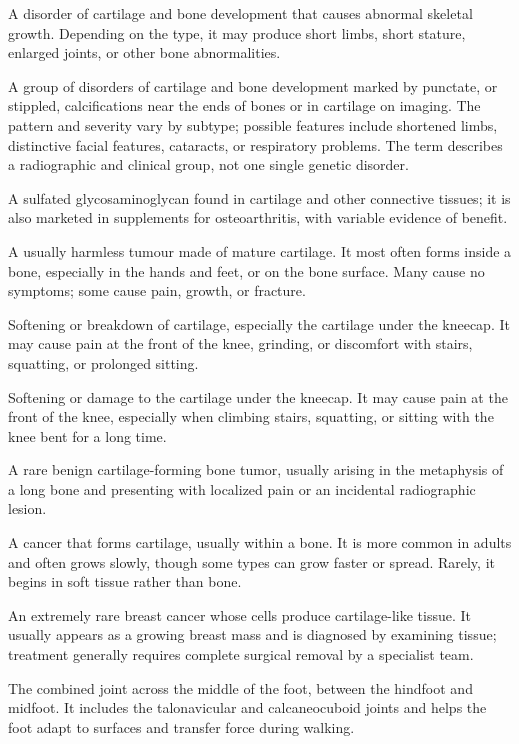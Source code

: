  A disorder of cartilage and bone development that causes abnormal skeletal growth. Depending on the type, it may produce short limbs, short stature, enlarged joints, or other bone abnormalities.

 A group of disorders of cartilage and bone development marked by
punctate, or stippled, calcifications near the ends of bones or in cartilage on imaging. The pattern
and severity vary by subtype; possible features include shortened limbs, distinctive facial features,
cataracts, or respiratory problems. The term describes a radiographic and clinical group, not one
single genetic disorder.

 A sulfated glycosaminoglycan found in cartilage and other connective tissues; it is also marketed in supplements for osteoarthritis, with variable evidence of benefit.

 A usually harmless tumour made of mature cartilage. It most often forms inside a bone, especially in the hands and feet, or on the bone surface. Many cause no symptoms; some cause pain, growth, or fracture.

 Softening or breakdown of cartilage, especially the cartilage under the kneecap. It may cause pain at the front of the knee, grinding, or discomfort with stairs, squatting, or prolonged sitting.

 Softening or damage to the cartilage
under the kneecap. It may cause pain at the front of the knee, especially
when climbing stairs, squatting, or sitting with the knee bent for a long time.

 A rare benign cartilage-forming bone tumor, usually arising in the metaphysis of a long bone and presenting with localized pain or an incidental radiographic lesion.

 A cancer that forms cartilage, usually within a bone. It is more common in adults and often grows slowly, though some types can grow faster or spread. Rarely, it begins in soft tissue rather than bone.

 An extremely rare breast cancer whose cells produce cartilage-like tissue. It usually appears as a growing breast mass and is diagnosed by examining tissue; treatment generally requires complete surgical removal by a specialist team.

 The combined joint across the middle of the foot, between the hindfoot and midfoot. It includes the talonavicular and calcaneocuboid joints and helps the foot adapt to surfaces and transfer force during walking.

